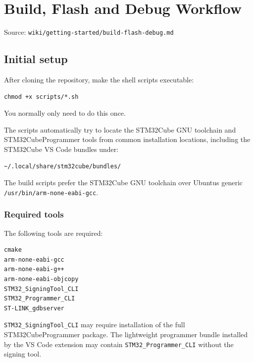 \documentclass[10pt,a4paper,oneside]{report}
\begin{document}
\chapter{Build, Flash and Debug Workflow}\label{wiki-getting-started-build-flash-debug--build-flash-and-debug-workflow}

{\small\color{MGSMuted}Source: \nolinkurl{wiki/getting-started/build-flash-debug.md}\par}\medskip

\section{Initial setup}\label{wiki-getting-started-build-flash-debug--1-initial-setup}

After cloning the repository, make the shell scripts executable:

\begin{verbatim}
chmod +x scripts/*.sh
\end{verbatim}

You normally only need to do this once.

The scripts automatically try to locate the STM32Cube GNU toolchain and STM32CubeProgrammer tools from common installation locations, including the STM32Cube VS Code bundles under:

\begin{verbatim}
~/.local/share/stm32cube/bundles/
\end{verbatim}

The build scripts prefer the STM32Cube GNU toolchain over Ubuntu\textquotesingle s generic \texttt{/\allowbreak{}usr/\allowbreak{}bin/\allowbreak{}arm-\allowbreak{}none-\allowbreak{}eabi-\allowbreak{}gcc}.

\subsection{Required tools}\label{wiki-getting-started-build-flash-debug--required-tools}

The following tools are required:

\begin{verbatim}
cmake
arm-none-eabi-gcc
arm-none-eabi-g++
arm-none-eabi-objcopy
STM32_SigningTool_CLI
STM32_Programmer_CLI
ST-LINK_gdbserver
\end{verbatim}

\texttt{STM32\_\allowbreak{}SigningTool\_\allowbreak{}CLI} may require installation of the full STM32CubeProgrammer package. The lightweight programmer bundle installed by the VS Code extension may contain \texttt{STM32\_\allowbreak{}Programmer\_\allowbreak{}CLI} without the signing tool.
\end{document}
